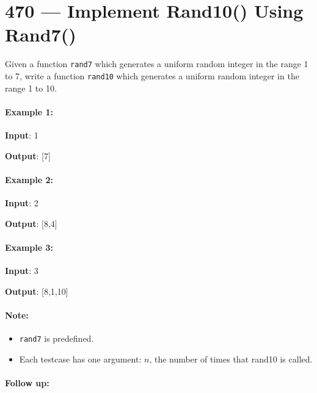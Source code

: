 \section{470 --- Implement Rand10() Using Rand7()}
Given a function \texttt{rand7} which generates a uniform random integer in the range 1 to 7, write a function \texttt{rand10} which generates a uniform random integer in the range 1 to 10.

\paragraph{Example 1:}

\begin{flushleft}
\textbf{Input}: 1

\textbf{Output}: [7]
\end{flushleft}

\paragraph{Example 2:}

\begin{flushleft}
\textbf{Input}: 2

\textbf{Output}: [8,4]
\end{flushleft}

\paragraph{Example 3:}

\begin{flushleft}
\textbf{Input}: 3

\textbf{Output}: [8,1,10]
\end{flushleft}
 

\paragraph{Note:}

\begin{itemize}
\item \texttt{rand7} is predefined.
\item Each testcase has one argument: $n$, the number of times that rand10 is called.
\end{itemize}
 

\paragraph{Follow up:}

